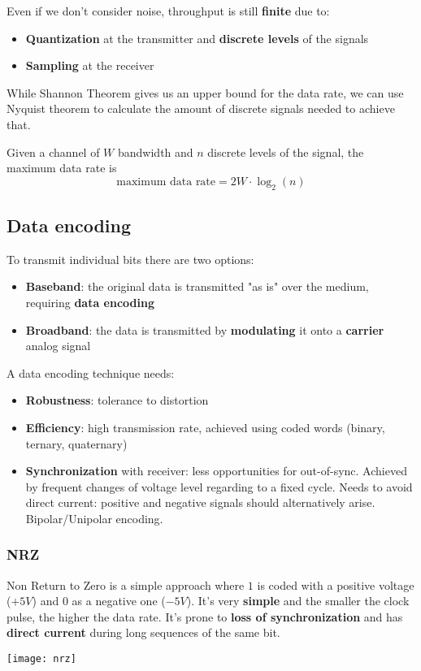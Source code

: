 
\noindent Even if we don't consider noise, throughput is still \textbf{finite} due to:
\begin{itemize}
	\item \textbf{Quantization} at the transmitter and \textbf{discrete levels} of the signals
	\item \textbf{Sampling} at the receiver
\end{itemize}
While Shannon Theorem gives us an upper bound for the data rate, we can use Nyquist theorem to calculate the amount of discrete signals needed to achieve that.
\begin{theorem}
	Given a channel of $W$ bandwidth and $n$ discrete levels of the signal, the maximum data rate is
	\begin{equation}
		\text{maximum data rate} = 2W \cdot \log_2(n)
	\end{equation}
\end{theorem}

\subsection{Data encoding}
To transmit individual bits there are two options:
\begin{itemize}
	\item \textbf{Baseband}: the original data is transmitted "as is" over the medium, requiring \textbf{data encoding}
	\item \textbf{Broadband}: the data is transmitted by \textbf{modulating} it onto a \textbf{carrier} analog signal
\end{itemize}
A data encoding technique needs:
\begin{itemize}
	\item \textbf{Robustness}: tolerance to distortion
	\item \textbf{Efficiency}: high transmission rate, achieved using coded words (binary, ternary, quaternary)
	\item \textbf{Synchronization} with receiver: less opportunities for out-of-sync. Achieved by frequent changes of voltage level regarding to a fixed cycle. Needs to avoid direct current: positive and negative signals should alternatively arise. Bipolar/Unipolar encoding.
\end{itemize}

\subsubsection{NRZ}
Non Return to Zero is a simple approach where $1$ is coded with a positive voltage ($+5V$) and $0$ 	as a negative one ($-5V$). It's very \textbf{simple} and the smaller the clock pulse, the higher the data rate. It's prone to \textbf{loss of synchronization} and has \textbf{direct current} during long sequences of the same bit.
\begin{center}
	\texttt{[image: nrz]}
\end{center}

